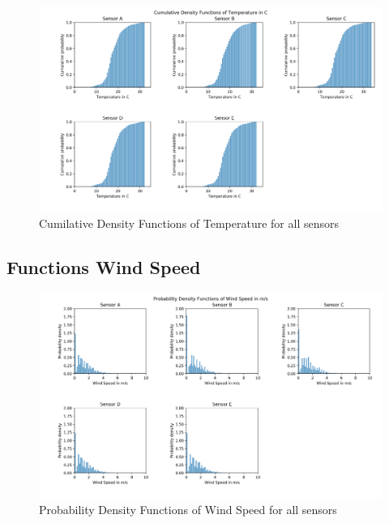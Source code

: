 \documentclass{article}
\begin{document}
            \begin{figure}[H]
                \includegraphics[width=\textwidth]{cdf_temp}
                \caption{Cumilative Density Functions of Temperature for all sensors}
            \end{figure}

        \subsection{Functions Wind Speed}
            \begin{figure}[H]
                \includegraphics[width=\textwidth]{pdf_windspeed}
                \caption{Probability Density Functions of Wind Speed for all sensors}
            \end{figure}
\end{document}
